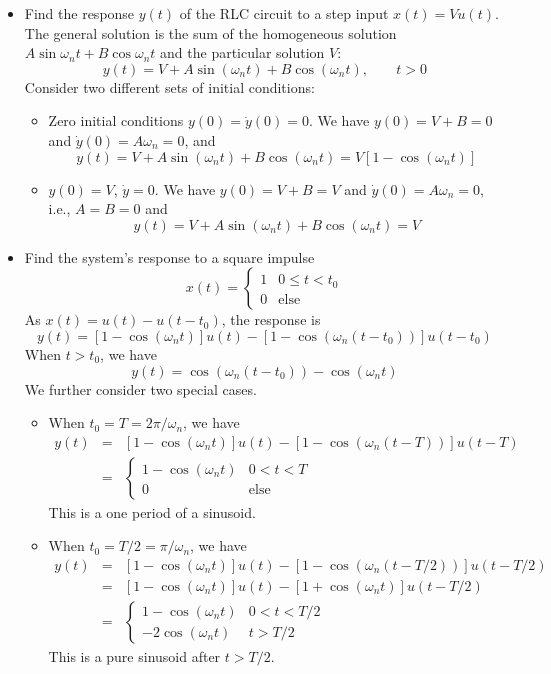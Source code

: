 \begin{itemize}
\item Find the response $y(t)$ of the RLC circuit to a step input $x(t)=Vu(t)$.
  The general solution is the sum of the homogeneous solution 
  $A\sin\omega_nt+B\cos\omega_nt$ and the particular solution $V$:
  \[ y(t)=V+A\sin(\omega_nt)+B\cos(\omega_nt),\;\;\;\;\;\;\;t>0 \]
  Consider two different sets of initial conditions:
  \begin{itemize}
  \item Zero initial conditions $y(0)=\dot{y}(0)=0$. We have $y(0)=V+B=0$ 
    and $\dot{y}(0)=A\omega_n=0$, and
    \[ y(t)=V+A\sin(\omega_nt)+B\cos(\omega_nt)=V[1-\cos(\omega_nt)] \]
  \item $y(0)=V$, $\dot{y}=0$. We have $y(0)=V+B=V$ and $\dot{y}(0)=A\omega_n=0$, 
    i.e., $A=B=0$ and
    \[ y(t)=V+A\sin(\omega_nt)+B\cos(\omega_nt)=V \]
  \end{itemize}
  

\item Find the system's response to a square impulse 
  \[
  x(t)=\left\{ \begin{array}{ll}1 & 0\le t< t_0 \\0 & \mbox{else} 
  \end{array} \right. 
  \]
  As $x(t)=u(t)-u(t-t_0)$, the response is
  \[
  y(t)=[1-\cos(\omega_nt)]u(t)-[1-\cos(\omega_n(t-t_0))]u(t-t_0) 
  \]
  When $t>t_0$, we have
  \[
  y(t)=\cos(\omega_n(t-t_0))-\cos(\omega_nt) 
  \]
  We further consider two special cases. 
  \begin{itemize}
  \item When $t_0=T=2\pi/\omega_n$, we have 
    \begin{eqnarray}
      y(t)&=&[1-\cos(\omega_nt)]u(t)-[1-\cos(\omega_n(t-T))]u(t-T)
      \nonumber \\
      &=&\left\{\begin{array}{cl} 1-\cos(\omega_nt) & 0<t<T \\ 0 & \mbox{else}
      \end{array} \right. 
      \nonumber 
    \end{eqnarray}
    This is a one period of a sinusoid.
  \item When $t_0=T/2=\pi/\omega_n$, we have
    \begin{eqnarray}
      y(t)&=&[1-\cos(\omega_nt)]u(t)-[1-\cos(\omega_n(t-T/2))]u(t-T/2)
      \nonumber \\
      &=&[1-\cos(\omega_nt)]u(t)-[1+\cos(\omega_nt)]u(t-T/2)
      \nonumber \\
      &=&\left\{\begin{array}{cl}1-\cos(\omega_nt) & 0<t<T/2 \\
      -2\cos(\omega_nt) & t>T/2 \end{array} \right.
      \nonumber 
    \end{eqnarray}
    This is a pure sinusoid after $t>T/2$.
  \end{itemize}


\end{itemize}
